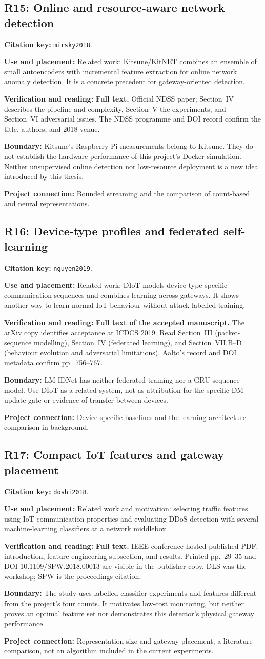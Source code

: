\documentclass[11pt,a4paper]{article}
\newcommand{\referenceentry}[3]{%
  \subsection{#1: #2}\label{ref:#3}%
  \fullcite{#3}\par
  \textbf{Citation key:} \texttt{#3}.\par}
\newcommand{\field}[2]{\textbf{#1:} #2\par}
\begin{document}
\referenceentry{R15}{Online and resource-aware network detection}{mirsky2018}
\field{Use and placement}{Related work: Kitsune/KitNET combines an ensemble
of small autoencoders with incremental feature extraction for online network
anomaly detection. It is a concrete precedent for gateway-oriented detection.}
\field{Verification and reading}{\textbf{Full text.} Official NDSS paper;
Section~IV describes the pipeline and complexity, Section~V the experiments,
and Section~VI adversarial issues. The NDSS programme and DOI record confirm
the title, authors, and 2018 venue.}
\field{Boundary}{Kitsune's Raspberry Pi measurements belong to Kitsune.
They do not establish the hardware performance of this project's Docker
simulation. Neither unsupervised online detection nor low-resource deployment
is a new idea introduced by this thesis.}
\field{Project connection}{Bounded streaming and the comparison of count-based
and neural representations.}

\referenceentry{R16}{Device-type profiles and federated self-learning}{nguyen2019}
\field{Use and placement}{Related work: D\"IoT models device-type-specific
communication sequences and combines learning across gateways. It shows
another way to learn normal IoT behaviour without attack-labelled training.}
\field{Verification and reading}{\textbf{Full text of the accepted manuscript.}
The arXiv copy identifies acceptance at ICDCS 2019. Read Section~III
(packet-sequence modelling), Section~IV (federated learning), and
Section~VII.B--D (behaviour evolution and adversarial limitations).
Aalto's record and DOI metadata confirm pp.~756--767.}
\field{Boundary}{LM-IDNet has neither federated training nor a GRU sequence
model. Use D\"IoT as a related system, not as attribution for the specific
DM update gate or evidence of transfer between devices.}
\field{Project connection}{Device-specific baselines and the learning-architecture
comparison in background.}

\referenceentry{R17}{Compact IoT features and gateway placement}{doshi2018}
\field{Use and placement}{Related work and motivation: selecting traffic
features using IoT communication properties and evaluating DDoS detection
with several machine-learning classifiers at a network middlebox.}
\field{Verification and reading}{\textbf{Full text.} IEEE conference-hosted
published PDF: introduction, feature-engineering subsection, and results.
Printed pp.~29--35 and DOI 10.1109/SPW.2018.00013 are visible in the
publisher copy. DLS was the workshop; SPW is the proceedings citation.}
\field{Boundary}{The study uses labelled classifier experiments and features
different from the project's four counts. It motivates low-cost monitoring,
but neither proves an optimal feature set nor demonstrates this detector's
physical gateway performance.}
\field{Project connection}{Representation size and gateway placement; a
literature comparison, not an algorithm included in the current experiments.}
\end{document}
